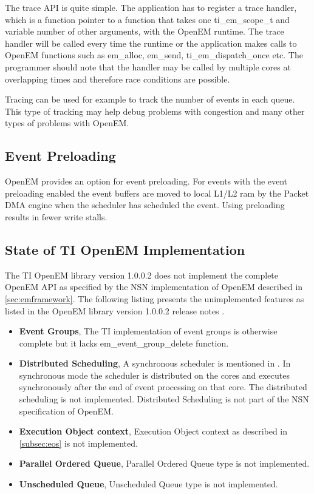 The trace API is quite simple. The application has to register a trace handler,
which is a function pointer to a function that takes one ti\_em\_scope\_t and
variable number of other arguments, with the OpenEM runtime. The trace handler
will be called every time the runtime or the application makes calls to OpenEM
functions such as em\_alloc, em\_send, ti\_em\_dispatch\_once etc.
\cite{openemapi} The programmer should note that the handler may be called by
multiple cores at overlapping times and therefore race conditions are possible.

Tracing can be used for example to track the number of events in each queue.
This type of tracking may help debug problems with congestion and many other
types of problems with OpenEM.

\subsection{Event Preloading}
OpenEM provides an option for event preloading. For events with the event
preloading enabled the event buffers are moved to local L1/L2 ram by the Packet
DMA engine when the scheduler has scheduled the event. Using preloading results
in fewer write stalls. \cite{openemwhite}

\subsection{State of TI OpenEM Implementation}
The TI OpenEM library version 1.0.0.2 does not implement the complete OpenEM API
as specified by the NSN implementation of OpenEM described in
\ref{sec:emframework}. The following listing presents the unimplemented features
as listed in the OpenEM library version 1.0.0.2 release notes
\cite{openemnotes}.

\begin{itemize}
    \item \textbf{Event Groups},
        The TI implementation of event groups is otherwise complete but it lacks
        em\_event\_group\_delete function.
    \item \textbf{Distributed Scheduling},
        A synchronous scheduler is mentioned in \cite{openemwhite}. In
        synchronous mode the scheduler is distributed on the cores and executes
        synchronously after the end of event processing on that core. The
        distributed scheduling is not implemented. Distributed Scheduling is not
        part of the NSN specification of OpenEM.
    \item \textbf{Execution Object context},
        Execution Object context as described in \ref{subsec:eos} is not
        implemented.
    \item \textbf{Parallel Ordered Queue},
        Parallel Ordered Queue type is not implemented.
    \item \textbf{Unscheduled Queue},
        Unscheduled Queue type is not implemented.
\end{itemize}

